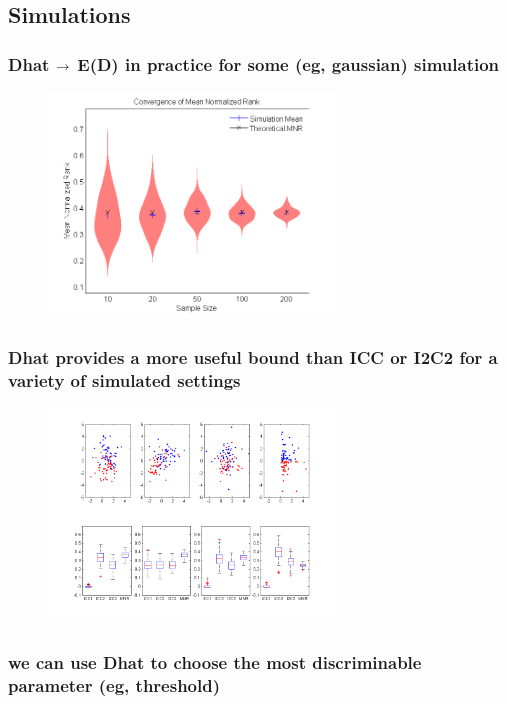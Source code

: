 \documentclass{article}
\begin{document}
\subsection{Simulations}

\subsubsection{Dhat $\rightarrow$ E(D) in practice for some (eg, gaussian) simulation}

\begin{figure}[t!]
\includegraphics[width=3.0in]{../Figs/simumnr_violin.png}
\caption{}
\label{fig:64}
\end{figure}




\subsubsection{Dhat provides a more useful bound than ICC or I2C2 for a variety of simulated settings}

\begin{figure}[t!]
\includegraphics[width=3.0in]{../Figs/Figure1_draft.png}
\caption{}
\label{fig:64}
\end{figure}



\subsubsection{we can use Dhat to choose the most discriminable parameter (eg, threshold)}
\end{document}
